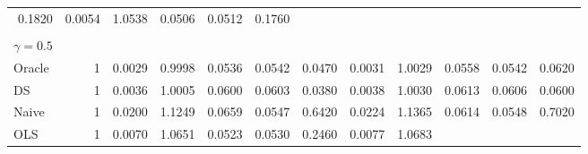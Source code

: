 \begin{tabular}{llllllllllll}
  \multicolumn{1}{r}{0.1820} &
  \multicolumn{1}{r}{0.0054} &
  \multicolumn{1}{r}{1.0538} &
  \multicolumn{1}{r}{0.0506} &
  \multicolumn{1}{r}{0.0512} &
  \multicolumn{1}{r}{0.1760} \\
\multicolumn{1}{l}{} &
  \multicolumn{1}{|r}{} &
  \multicolumn{1}{r}{} &
  \multicolumn{1}{r}{} &
  \multicolumn{1}{r}{} &
  \multicolumn{1}{r}{} &
  \multicolumn{1}{r}{} &
  \multicolumn{1}{r}{} &
  \multicolumn{1}{r}{} &
  \multicolumn{1}{r}{} &
  \multicolumn{1}{r}{} &
  \multicolumn{1}{r}{} \\
\multicolumn{1}{l}{$\gamma = 0.5$} &
  \multicolumn{1}{|r}{} &
  \multicolumn{1}{r}{} &
  \multicolumn{1}{r}{} &
  \multicolumn{1}{r}{} &
  \multicolumn{1}{r}{} &
  \multicolumn{1}{r}{} &
  \multicolumn{1}{r}{} &
  \multicolumn{1}{r}{} &
  \multicolumn{1}{r}{} &
  \multicolumn{1}{r}{} &
  \multicolumn{1}{r}{} \\
\multicolumn{1}{l}{\hspace{1em}Oracle} &
  \multicolumn{1}{|r}{1} &
  \multicolumn{1}{r}{0.0029} &
  \multicolumn{1}{r}{0.9998} &
  \multicolumn{1}{r}{0.0536} &
  \multicolumn{1}{r}{0.0542} &
  \multicolumn{1}{r}{0.0470} &
  \multicolumn{1}{r}{0.0031} &
  \multicolumn{1}{r}{1.0029} &
  \multicolumn{1}{r}{0.0558} &
  \multicolumn{1}{r}{0.0542} &
  \multicolumn{1}{r}{0.0620} \\
\multicolumn{1}{l}{\hspace{1em}DS} &
  \multicolumn{1}{|r}{1} &
  \multicolumn{1}{r}{0.0036} &
  \multicolumn{1}{r}{1.0005} &
  \multicolumn{1}{r}{0.0600} &
  \multicolumn{1}{r}{0.0603} &
  \multicolumn{1}{r}{0.0380} &
  \multicolumn{1}{r}{0.0038} &
  \multicolumn{1}{r}{1.0030} &
  \multicolumn{1}{r}{0.0613} &
  \multicolumn{1}{r}{0.0606} &
  \multicolumn{1}{r}{0.0600} \\
\multicolumn{1}{l}{\hspace{1em}Naive} &
  \multicolumn{1}{|r}{1} &
  \multicolumn{1}{r}{0.0200} &
  \multicolumn{1}{r}{1.1249} &
  \multicolumn{1}{r}{0.0659} &
  \multicolumn{1}{r}{0.0547} &
  \multicolumn{1}{r}{0.6420} &
  \multicolumn{1}{r}{0.0224} &
  \multicolumn{1}{r}{1.1365} &
  \multicolumn{1}{r}{0.0614} &
  \multicolumn{1}{r}{0.0548} &
  \multicolumn{1}{r}{0.7020} \\
\multicolumn{1}{l}{\hspace{1em}OLS} &
  \multicolumn{1}{|r}{1} &
  \multicolumn{1}{r}{0.0070} &
  \multicolumn{1}{r}{1.0651} &
  \multicolumn{1}{r}{0.0523} &
  \multicolumn{1}{r}{0.0530} &
  \multicolumn{1}{r}{0.2460} &
  \multicolumn{1}{r}{0.0077} &
  \multicolumn{1}{r}{1.0683} &

\end{tabular}
